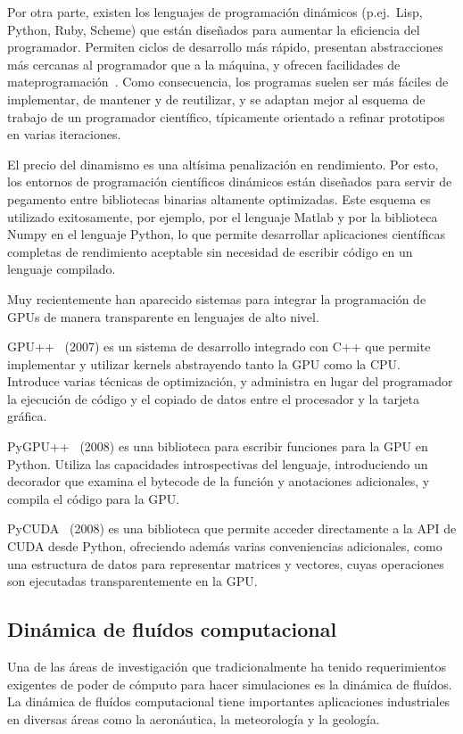 \documentclass[11pt,spanish]{article}
\begin{document}
Por otra parte, existen los lenguajes de programación dinámicos (p.ej.~Lisp,
Python, Ruby, Scheme) que están diseñados para aumentar la eficiencia
del programador.  Permiten ciclos de desarrollo más rápido, presentan
abstracciones más cercanas al programador que a la máquina, y ofrecen
facilidades de mateprogramación~\cite[\S2]{pygpu}.  Como consecuencia, los
programas suelen ser más fáciles de implementar, de mantener y de reutilizar,
y se adaptan mejor al esquema de trabajo de un programador científico,
típicamente orientado a refinar prototipos en varias iteraciones.

El precio del dinamismo es una altísima penalización en rendimiento.  Por esto,
los entornos de programación científicos dinámicos están diseñados para servir
de pegamento entre bibliotecas binarias altamente optimizadas.  Este esquema es
utilizado exitosamente, por ejemplo, por el lenguaje Matlab y por la biblioteca
Numpy en el lenguaje Python, lo que permite desarrollar aplicaciones científicas
completas de rendimiento aceptable sin necesidad de escribir código en un
lenguaje compilado.

Muy recientemente han aparecido sistemas para integrar la programación de GPUs
de manera transparente en lenguajes de alto nivel.

GPU++~\cite{gpupp} (2007) es un sistema de desarrollo integrado con C++ que
permite implementar y utilizar kernels abstrayendo tanto la GPU como la CPU.
Introduce varias técnicas de optimización, y administra en lugar del programador
la ejecución de código y el copiado de datos entre el procesador y la tarjeta
gráfica.

PyGPU++~\cite{pygpu} (2008) es una biblioteca para escribir funciones para la
GPU en Python. Utiliza las capacidades introspectivas del lenguaje,
introduciendo un decorador que examina el bytecode de la función y anotaciones
adicionales, y compila el código para la GPU.

PyCUDA~\cite{pycuda} (2008) es una biblioteca que permite acceder directamente a
la API de CUDA desde Python, ofreciendo además varias conveniencias adicionales,
como una estructura de datos para representar matrices y vectores, cuyas
operaciones son ejecutadas transparentemente en la GPU.


\subsection{Dinámica de fluídos computacional}
Una de las áreas de investigación que tradicionalmente ha tenido requerimientos
exigentes de poder de cómputo para hacer simulaciones es la dinámica de fluídos.
La dinámica de fluídos computacional tiene importantes aplicaciones industriales
en diversas áreas como la aeronáutica, la meteorología y la geología.
\end{document}
